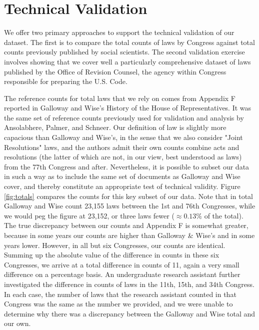 \documentclass[fleqn,10pt]{wlscirep}
\begin{document}

\section*{Technical Validation}


We offer two primary approaches to support the technical validation of our dataset. The first is to compare the total counts of laws by Congress against total counts previously published by social scientists. The second validation exercise involves showing that we cover well a particularly comprehensive dataset of laws published by the Office of Revision Counsel, the agency within Congress  responsible for preparing the U.S. Code.

The reference counts for total laws that we rely on comes from Appendix F reported in Galloway and Wise's History of the House of Representatives\nocite{gallowaywise}. It was the same set of reference counts previously used for validation and analysis by Ansolabhere, Palmer, and Schneer.\cite{ansolabehere_palmer_schneer_2016} Our definition of law is slightly more capacious than Galloway and Wise's, in the sense that we also consider "Joint Resolutions" laws, and the authors admit their own counts combine acts and resolutions (the latter of which are not, in our view, best understood as laws) from the 77th Congress and after. Nevertheless, it is possible to subset our data in such a way as to include the same set of documents as Galloway and Wise cover, and thereby constitute an appropriate test of technical validity. Figure \ref{fig:totals} compares the counts for this key subset of our data. Note that in total Galloway and Wise count 23,155 laws between the 1st and 76th Congresses, while we would peg the figure at 23,152, or three laws fewer ($\approx 0.13\%$ of the total). The true discrepancy between our counts and Appendix F is somewhat greater, because in some years our counts are higher than Galloway \& Wise's and in some years lower. However, in all but six Congresses, our counts are identical. Summing up the absolute value of the difference in counts in these six Congresses, we arrive at a total difference in counts of 11, again a very small difference on a percentage basis. An undergraduate research assistant further investigated the difference in counts of laws in  the 11th, 15th, and 34th Congress. In each case, the number of laws that the research assistant counted in that Congress was the same as the number we provided, and we were unable to determine why there was a discrepancy between the Galloway and Wise total and our own. 
\end{document}
